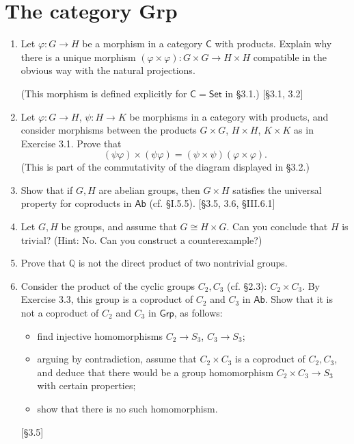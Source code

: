 \section{The category Grp}
\begin{enumerate}
    \item Let $\varphi: G \to H$ be a morphism in a category $\mathsf{C}$ with products. Explain why there is a unique morphism $(\varphi \times \varphi): G \times G \to H \times H$ compatible in the obvious way with the natural projections.

          (This morphism is defined explicitly for $\mathsf{C} = \mathsf{Set}$ in \S3.1.) [\S3.1, 3.2]

    \item Let $\varphi: G \to H$, $\psi: H \to K$ be morphisms in a category with products, and consider morphisms between the products $G \times G$, $H \times H$, $K \times K$ as in Exercise 3.1. Prove that
          \[ (\psi\varphi) \times (\psi\varphi) = (\psi \times \psi)(\varphi \times \varphi). \]
          (This is part of the commutativity of the diagram displayed in \S3.2.)

    \item Show that if $G, H$ are abelian groups, then $G \times H$ satisfies the universal property for coproducts in $\mathsf{Ab}$ (cf. \S I.5.5). [\S3.5, 3.6, \S III.6.1]

    \item Let $G, H$ be groups, and assume that $G \cong H \times G$. Can you conclude that $H$ is trivial? (Hint: No. Can you construct a counterexample?)

    \item Prove that $\mathbb{Q}$ is not the direct product of two nontrivial groups.

    \item Consider the product of the cyclic groups $C_2, C_3$ (cf. \S2.3): $C_2 \times C_3$. By Exercise 3.3, this group is a coproduct of $C_2$ and $C_3$ in $\mathsf{Ab}$. Show that it is not a coproduct of $C_2$ and $C_3$ in $\mathsf{Grp}$, as follows:
          \begin{itemize}
              \item find injective homomorphisms $C_2 \to S_3$, $C_3 \to S_3$;
              \item arguing by contradiction, assume that $C_2 \times C_3$ is a coproduct of $C_2, C_3$, and deduce that there would be a group homomorphism $C_2 \times C_3 \to S_3$ with certain properties;
              \item show that there is no such homomorphism.
          \end{itemize}
          [\S3.5]


\end{enumerate}
